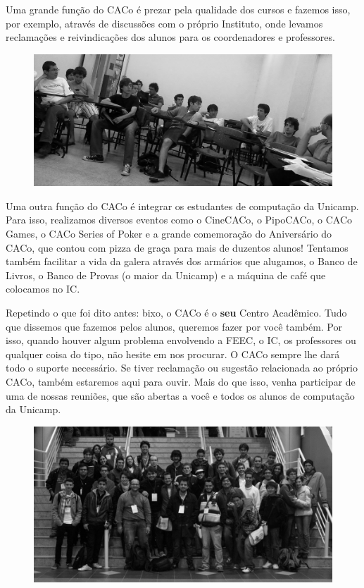 Uma grande função do CACo é prezar pela qualidade dos cursos e fazemos isso, por
exemplo, através de discussões com o próprio Instituto, onde levamos reclamações
e reivindicações dos alunos para os coordenadores e professores.

\begin{figure}[H]
    \centering
    \includegraphics[scale=0.21]{img/caco/reuniao.jpg}
\end{figure}

Uma outra função do CACo é integrar os estudantes de computação da Unicamp. Para
isso, realizamos diversos eventos como o CineCACo, o PipoCACo, o CACo Games, o
CACo Series of Poker e a grande comemoração do Aniversário do CACo, que contou
com pizza de graça para mais de duzentos alunos! Tentamos também facilitar a
vida da galera através dos armários que alugamos, o Banco de Livros, o Banco de
Provas (o maior da Unicamp) e a máquina de café que colocamos no IC.

Repetindo o que foi dito antes: bixo, o CACo é o \textbf{seu} Centro Acadêmico.
Tudo que dissemos que fazemos pelos alunos, queremos fazer por você também. Por
isso, quando houver algum problema envolvendo a FEEC, o IC, os professores ou
qualquer coisa do tipo, não hesite em nos procurar. O CACo sempre lhe dará todo
o suporte necessário. Se tiver reclamação ou sugestão relacionada ao próprio
CACo, também estaremos aqui para ouvir. Mais do que isso, venha participar de
uma de nossas reuniões, que são abertas a você e todos os alunos de computação
da Unicamp.

\begin{figure}[H]
    \centering
    \includegraphics[scale=0.21]{img/caco/fisl2.jpg}
\end{figure}

